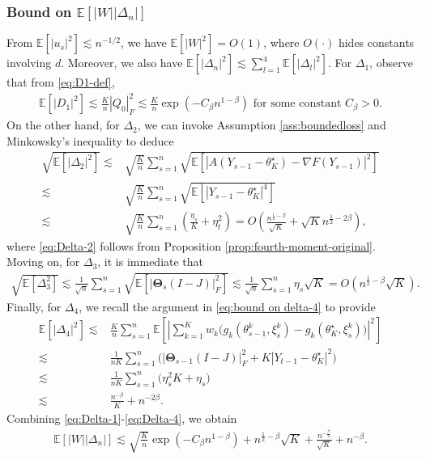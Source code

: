 \documentclass[a4paper,11pt]{article}
\numberwithin{equation}{section}
\theoremstyle{plain}
\theoremstyle{remark}
\def\IE{\mathbb{E}}
\def\bT{\mathbf{\Theta}}
\newcommand{\minparam}{\theta^\star_K}
\begin{document}
\subsubsection{Bound on $\IE[|W||\Delta_n|]$}
From $\IE[|u_s|^2]\lesssim n^{-1/2}$, we have $\IE[|W|^2] = O(1)$, where $O(\cdot)$ hides constants involving $d$. Moreover, we also have $\IE[|\Delta_n|^2] \lesssim \sum_{l=1}^4 \IE[|\Delta_l|^2]$. For $\Delta_1$, observe that from \eqref{eq:D1-def},
\begin{align}
    \IE[|D_1|^2] \lesssim \frac{K}{n} |Q_0|_F^2 \lesssim \frac{K}{n}\exp(-C_{\beta}n^{1-\beta}) \text{ for some constant $C_{\beta}>0$} \label{eq:Delta-1}.
\end{align}
On the other hand, for $\Delta_2$, we can invoke Assumption \ref{ass:boundedloss} and Minkowsky's inequality to deduce
\begin{align}
    \sqrt{\IE[|\Delta_2|^2]} \lesssim & \sqrt{\frac{K}{n}} \sum_{s=1}^n \sqrt{\IE[|A(Y_{s-1} - \minparam) - \nabla F(Y_{s-1})|^2]} \nonumber\\
    \lesssim & \sqrt{\frac{K}{n}} \sum_{s=1}^n \sqrt{\IE[|Y_{s-1} - \minparam|^4]} \nonumber\\
    \lesssim & \sqrt{\frac{K}{n}} \sum_{s=1}^n (\frac{\eta_s}{K}+\eta_t^2) = O(\frac{n^{\frac{1}{2}-\beta}}{\sqrt{K}}+ \sqrt{K}n^{\frac{1}{2}-2\beta}) \label{eq:Delta-2},
\end{align}
where \eqref{eq:Delta-2} follows from Proposition \ref{prop:fourth-moment-original}. Moving on, for $\Delta_3$, it is immediate that
\begin{align}
    \sqrt{\IE[\Delta_3^2]} \lesssim \frac{1}{\sqrt{n}} \sum_{s=1}^n \sqrt{\IE[|\bT_s(I-J)|_F^2]} \lesssim \frac{1}{\sqrt{n}} \sum_{s=1}^n \eta_s \sqrt{K} =O(n^{\frac{1}{2}-\beta} \sqrt{K}) \label{eq:Delta-3}.
\end{align}
Finally, for $\Delta_4$, we recall the argument in \eqref{eq:bound on delta-4} to provide
\begin{align}
    \IE[|\Delta_4|^2]\lesssim&\frac{K}{n} \sum_{s=1}^n \IE[|\sum_{k=1}^K w_k\big(g_k(\theta_{s-1}^k, \xi_s^k)-g_k(\minparam, \xi_s^k) \big)|^2] \nonumber\\
    \lesssim & \frac{1}{nK}\sum_{s=1}^n \big( |\bT_{s-1}(I-J)|_F^2 + K|Y_{t-1}-\minparam|^2 \big) \nonumber\\
    \lesssim & \frac{1}{nK} \sum_{s=1}^n\big(\eta_s^2K + \eta_s\big) \nonumber\\
    \lesssim & \frac{n^{-\beta}}{K} + n^{-2\beta}. \label{eq:Delta-4}
\end{align}
Combining \eqref{eq:Delta-1}-\eqref{eq:Delta-4}, we obtain
\begin{align}
    \IE[|W||\Delta_n|] \lesssim \sqrt{\frac{K}{n}}\exp(-C_{\beta} n^{1-\beta}) + n^{\frac{1}{2}-\beta} \sqrt{K} + \frac{n^{-\frac{\beta}{2}}}{\sqrt{K}}+ n^{-\beta}. \label{eq:bound-on-original-terms}
\end{align}
\end{document}
